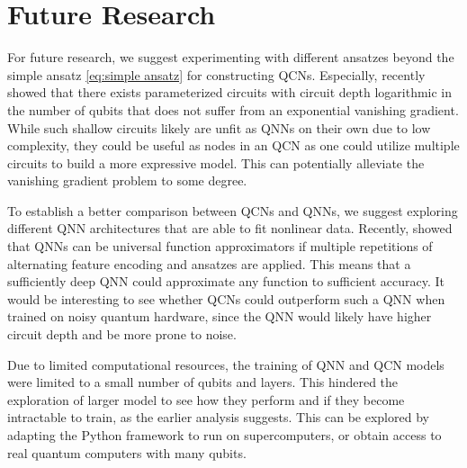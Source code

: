 \section{Future Research}\label{sec:future}
For future research, we suggest experimenting with different ansatzes beyond the simple ansatz \autoref{eq:simple ansatz} for constructing QCNs. Especially, \citet{Cerezo_2021} recently showed that there exists parameterized circuits with circuit depth logarithmic in the number of qubits that does not suffer from an exponential vanishing gradient. While such shallow circuits likely are unfit as QNNs on their own due to low complexity, they could be useful as nodes in an QCN as one could utilize multiple circuits to build a more expressive model. This can potentially alleviate the vanishing gradient problem to some degree.

To establish a better comparison between QCNs and QNNs, we suggest exploring different QNN architectures that are able to fit nonlinear data. Recently, \citet{Schuld_2021} showed that QNNs can be universal function approximators if multiple repetitions of alternating feature encoding and ansatzes are applied. This means that a sufficiently deep QNN could approximate any function to sufficient accuracy. It would be interesting to see whether QCNs could outperform such a QNN when trained on noisy quantum hardware, since the QNN would likely have higher circuit depth and be more prone to noise.

Due to limited computational resources, the training of QNN and QCN models were limited to a small number of qubits and layers. This hindered the exploration of larger model to see how they perform and if they become intractable to train, as the earlier analysis suggests. This can be explored by adapting the Python framework to run on supercomputers, or obtain access to real quantum computers with many qubits.



